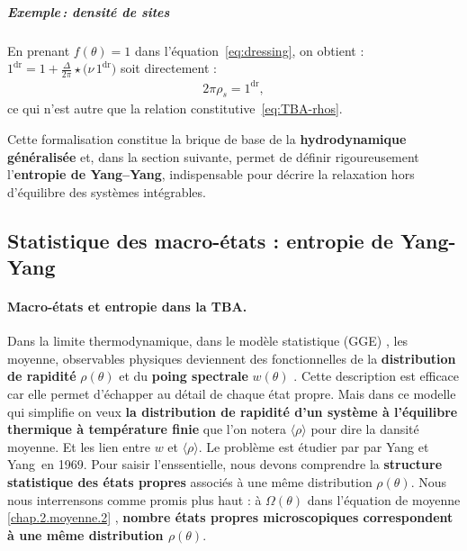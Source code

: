 \subparagraph{Exemple\,: densité de sites}

En prenant $f(\theta) = 1$ dans l’équation~\eqref{eq:dressing}, on obtient :
\(
1^{\mathrm{dr}}=1+\frac{\Delta}{2\pi}\star\bigl(\nu\,1^{\mathrm{dr}}\bigr)
\) soit directement : 
\begin{eqnarray}
	2\pi\rho_s = 1^{\mathrm{dr}},
\end{eqnarray}
ce qui n’est autre que la relation constitutive~\eqref{eq:TBA-rhos}.

\medskip
Cette formalisation constitue la brique de base de la \textbf{hydrodynamique généralisée} et, dans la section suivante, permet de définir rigoureusement l’\textbf{entropie de Yang–Yang}, indispensable pour décrire la relaxation hors d’équilibre des systèmes intégrables.


%



\subsection{Statistique des macro-états : entropie de Yang-Yang}

\paragraph{Macro-états et entropie dans la TBA.}

Dans la limite thermodynamique, dans le modèle statistique (GGE) , les moyenne, observables physiques deviennent des fonctionnelles de la {\bf distribution de rapidité}  $\rho(\theta)$ et du {\bf poing spectrale} $w(\theta)$ . Cette description est efficace car elle permet d’échapper au détail de chaque état propre. 
Mais dans ce modelle qui simplifie on veux {\bf la distribution de rapidité d’un système à l'équilibre thermique à température finie} que l'on notera $\langle \rho \rangle$ pour dire la dansité moyenne. Et les lien entre  $w$ et $\langle \rho \rangle$.  Le problème est étudier par par Yang et Yang en 1969. Pour saisir l'enssentielle, nous devons comprendre la {\bf structure statistique des états propres} associés à une même distribution $\rho(\theta)$. Nous nous interrensons comme promis plus haut : à $\Omega(\theta)$ dans l'équation de moyenne \eqref{chap.2.moyenne.2}  ,  {\bf  nombre états propres microscopiques correspondent à une même distribution $\rho(\theta)$}.

